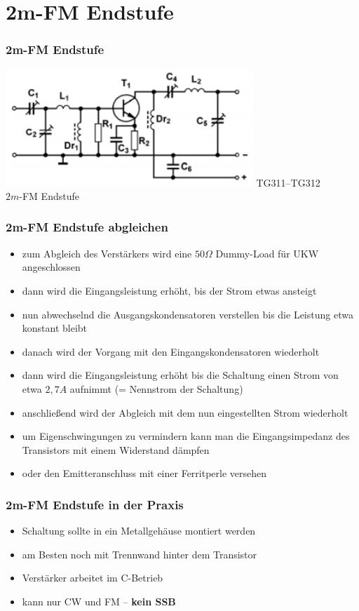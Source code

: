 \section*{2m-FM Endstufe}
\begin{frame}
  \frametitle{2m-FM Endstufe}
  \begin{center}
    \includegraphics[width=0.7\textwidth,height=.7\textheight,keepaspectratio]{a17/TG311.png}
    {\tiny TG311--TG312 \hyperlink{refs}{\cite{bna}}}\\
    $2m$-FM Endstufe
  \end{center}
\end{frame}
\begin{frame}
  \frametitle{2m-FM Endstufe abgleichen}
  \begin{itemize}
    \item zum Abgleich des Verstärkers wird eine $50 \Omega$ Dummy-Load für UKW angeschlossen
    \item dann wird die Eingangsleistung erhöht, bis der Strom etwas ansteigt
    \item nun abwechselnd die Ausgangskondensatoren verstellen bis die Leistung etwa konstant bleibt
    \item danach wird der Vorgang mit den Eingangskondensatoren wiederholt
    \item dann wird die Eingangsleistung erhöht bis die Schaltung einen Strom von etwa $2,7 A$ aufnimmt (= Nennstrom der Schaltung)
    \item anschließend wird der Abgleich mit dem nun eingestellten Strom wiederholt
    \item um Eigenschwingungen zu vermindern kann man die Eingangsimpedanz des Transistors mit einem Widerstand dämpfen
    \item oder den Emitteranschluss mit einer Ferritperle versehen
  \end{itemize}
\end{frame}

\begin{frame}
  \frametitle{2m-FM Endstufe in der Praxis}
  \begin{itemize}
    \item Schaltung sollte in ein Metallgehäuse montiert werden
    \item am Besten noch mit Trennwand hinter dem Transistor
    \item Verstärker arbeitet im C-Betrieb
    \item kann nur CW und FM -- \textbf{kein SSB}
  \end{itemize}
\end{frame}

